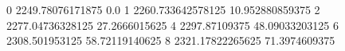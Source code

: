 0 2249.78076171875 0.0
1 2260.733642578125 10.952880859375
2 2277.04736328125 27.2666015625
4 2297.87109375 48.09033203125
6 2308.501953125 58.72119140625
8 2321.17822265625 71.3974609375
